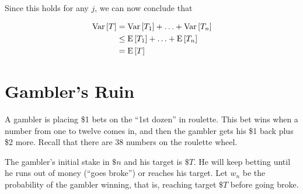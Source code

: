 \documentclass[12pt]{article}
\begin{document}
\begin{itemize}
{Since this holds for any $j$, we can now conclude that

\begin{align*}
\mathop{\textup{Var}}\nolimits\left[T\right]
& = \mathop{\textup{Var}}\nolimits\left[T_1\right] + \ldots + \mathop{\textup{Var}}\nolimits\left[T_n\right]\\
& \leq \mathop{\textup{E}}\nolimits\left[T_1\right] + \ldots + \mathop{\textup{E}}\nolimits\left[T_n\right]\\
& = \mathop{\textup{E}}\nolimits\left[T\right]\\
\end{align*}
}

\end{itemize}
\newpage
\section{Gambler's Ruin}
  A gambler is placing \$1 bets on the ``1st dozen'' in roulette.
  This bet wins when a number from one to twelve comes in, and then
  the gambler gets his \$1 back plus \$2 more.  Recall that there are
  38 numbers on the roulette wheel.

  The gambler's initial stake in $\$n$ and his target is $\$T$.  He
  will keep betting until he runs out of money (``goes broke'') or
  reaches his target.  Let $w_n$ be the probability of the gambler
  winning, that is, reaching target $\$T$ before going broke.
\end{document}
